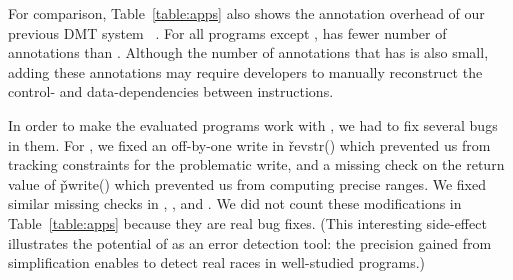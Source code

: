 For comparison, Table~\ref{table:apps} also shows the annotation overhead of our previous DMT system \tern~\cite{cui:tern:osdi10}.  For all programs except \apache, \peregrine
has fewer number of annotations than \tern.  Although the number
of annotations that \tern has is also small, adding these annotations may
require developers to manually reconstruct the control- and
data-dependencies between instructions.

In order to make the evaluated programs work with \peregrine, we had to fix several bugs
in them.  For \aget, we fixed an off-by-one write in \v{revstr()} which
prevented us from tracking constraints for the problematic write, and a
missing check on the return value of \v{pwrite()} which prevented us from
computing precise ranges.  We fixed similar missing checks in \swaptions,
\streamcluster, and \radix.  We did not count these modifications in
Table~\ref{table:apps} because they are real bug fixes.  (This interesting
side-effect illustrates the potential of \peregrine as an error detection tool:
the precision gained from simplification enables \peregrine to detect real races
in well-studied programs.)


